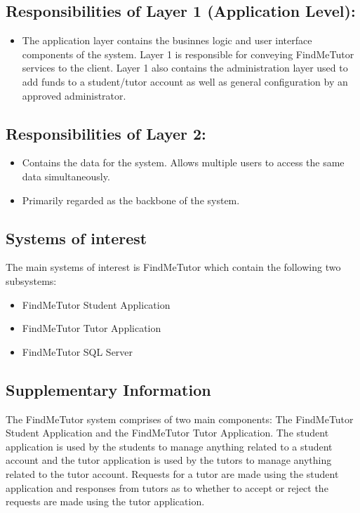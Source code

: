\documentclass[12pt]{article}
\begin{document}
\subsection{Responsibilities of Layer 1 (Application Level):}
\begin{itemize}
\item The application layer contains the businnes logic and user interface components of the system. Layer 1 is responsible for conveying FindMeTutor services to the client. Layer 1 also contains the administration layer used to add funds to a student/tutor account as well as general configuration by an approved administrator.
\end{itemize}

\subsection{Responsibilities of Layer 2:}
\begin{itemize}
\item Contains the data for the system. Allows multiple users to access the same data simultaneously.
\item Primarily regarded as the backbone of the system.
\end{itemize}

\subsection{Systems of interest}
The main systems of interest is FindMeTutor which contain the following two subsystems:
\begin{itemize}
\item FindMeTutor Student Application
\item FindMeTutor Tutor Application
\item FindMeTutor SQL Server
\end{itemize}

\subsection{Supplementary Information}
The FindMeTutor system comprises of two main components: The FindMeTutor Student Application and the FindMeTutor Tutor Application. The student application is used by the students to manage anything related to a student account and the tutor application is used by the tutors to manage anything related to the tutor account. Requests for a tutor are made using the student application and responses from tutors as to whether to accept or reject the requests are made using the tutor application.
\end{document}
